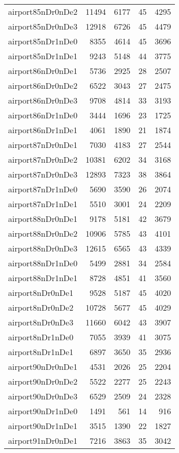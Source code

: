 \begin{longtable}{lrrrr}
airport85nDr0nDe2 & 11494 & 6177 & 45 & 4295 \\
airport85nDr0nDe3 & 12918 & 6726 & 45 & 4479 \\
airport85nDr1nDe0 & 8355 & 4614 & 45 & 3696 \\
airport85nDr1nDe1 & 9243 & 5148 & 44 & 3775 \\
airport86nDr0nDe1 & 5736 & 2925 & 28 & 2507 \\
airport86nDr0nDe2 & 6522 & 3043 & 27 & 2475 \\
airport86nDr0nDe3 & 9708 & 4814 & 33 & 3193 \\
airport86nDr1nDe0 & 3444 & 1696 & 23 & 1725 \\
airport86nDr1nDe1 & 4061 & 1890 & 21 & 1874 \\
airport87nDr0nDe1 & 7030 & 4183 & 27 & 2544 \\
airport87nDr0nDe2 & 10381 & 6202 & 34 & 3168 \\
airport87nDr0nDe3 & 12893 & 7323 & 38 & 3864 \\
airport87nDr1nDe0 & 5690 & 3590 & 26 & 2074 \\
airport87nDr1nDe1 & 5510 & 3001 & 24 & 2209 \\
airport88nDr0nDe1 & 9178 & 5181 & 42 & 3679 \\
airport88nDr0nDe2 & 10906 & 5785 & 43 & 4101 \\
airport88nDr0nDe3 & 12615 & 6565 & 43 & 4339 \\
airport88nDr1nDe0 & 5499 & 2881 & 34 & 2584 \\
airport88nDr1nDe1 & 8728 & 4851 & 41 & 3560 \\
airport8nDr0nDe1 & 9528 & 5187 & 45 & 4020 \\
airport8nDr0nDe2 & 10728 & 5677 & 45 & 4029 \\
airport8nDr0nDe3 & 11660 & 6042 & 43 & 3907 \\
airport8nDr1nDe0 & 7055 & 3939 & 41 & 3075 \\
airport8nDr1nDe1 & 6897 & 3650 & 35 & 2936 \\
airport90nDr0nDe1 & 4531 & 2026 & 25 & 2204 \\
airport90nDr0nDe2 & 5522 & 2277 & 25 & 2243 \\
airport90nDr0nDe3 & 6529 & 2509 & 24 & 2328 \\
airport90nDr1nDe0 & 1491 & 561 & 14 & 916 \\
airport90nDr1nDe1 & 3515 & 1390 & 22 & 1827 \\
airport91nDr0nDe1 & 7216 & 3863 & 35 & 3042 \\

\end{longtable}
